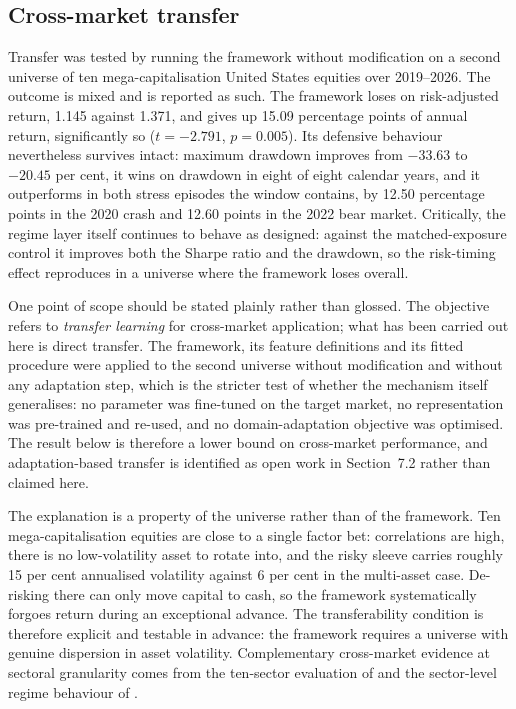 \subsection{Cross-market transfer}

Transfer was tested by running the framework without modification on a second universe of
ten mega-capitalisation United States equities over 2019--2026. The outcome is mixed and
is reported as such. The framework loses on risk-adjusted return, 1.145 against 1.371, and
gives up 15.09 percentage points of annual return, significantly so ($t = -2.791$,
$p = 0.005$). Its defensive behaviour nevertheless survives intact: maximum drawdown
improves from $-33.63$ to $-20.45$ per cent, it wins on drawdown in eight of eight
calendar years, and it outperforms in both stress episodes the window contains, by 12.50
percentage points in the 2020 crash and 12.60 points in the 2022 bear market. Critically,
the regime layer itself continues to behave as designed: against the matched-exposure
control it improves both the Sharpe ratio and the drawdown, so the risk-timing effect
reproduces in a universe where the framework loses overall.

One point of scope should be stated plainly rather than glossed. The objective refers to
\emph{transfer learning} for cross-market application; what has been carried out here is
direct transfer. The framework, its feature definitions and its fitted procedure were
applied to the second universe without modification and without any adaptation step, which
is the stricter test of whether the mechanism itself generalises: no parameter was
fine-tuned on the target market, no representation was pre-trained and re-used, and no
domain-adaptation objective was optimised. The result below is therefore a lower bound on
cross-market performance, and adaptation-based transfer is identified as open work in
Section~7.2 rather than claimed here.

The explanation is a property of the universe rather than of the framework. Ten
mega-capitalisation equities are close to a single factor bet: correlations are high,
there is no low-volatility asset to rotate into, and the risky sleeve carries roughly 15
per cent annualised volatility against 6 per cent in the multi-asset case. De-risking
there can only move capital to cash, so the framework systematically forgoes return during
an exceptional advance. The transferability condition is therefore explicit and testable
in advance: the framework requires a universe with genuine dispersion in asset volatility.
Complementary cross-market evidence at sectoral granularity comes from the ten-sector
evaluation of  and the sector-level regime behaviour of .

